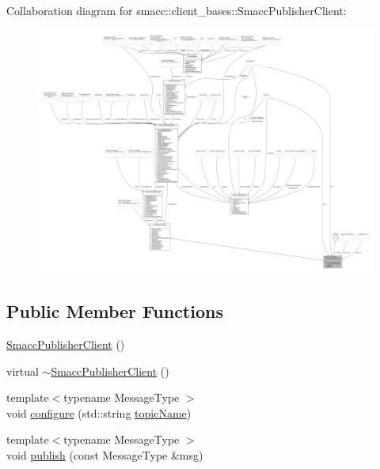 Collaboration diagram for smacc\+:\+:client\+\_\+bases\+:\+:Smacc\+Publisher\+Client\+:
\nopagebreak
\begin{figure}[H]
\begin{center}
\leavevmode
\includegraphics[width=350pt]{classsmacc_1_1client__bases_1_1SmaccPublisherClient__coll__graph}
\end{center}
\end{figure}
\subsection*{Public Member Functions}
\begin{DoxyCompactItemize}
\item 
\hyperlink{classsmacc_1_1client__bases_1_1SmaccPublisherClient_ac1713f185a2b81c6143a8fea042d53fa}{Smacc\+Publisher\+Client} ()
\item 
virtual \hyperlink{classsmacc_1_1client__bases_1_1SmaccPublisherClient_ad528f768a7b99560db514924f9cb789f}{$\sim$\+Smacc\+Publisher\+Client} ()
\item 
{\footnotesize template$<$typename Message\+Type $>$ }\\void \hyperlink{classsmacc_1_1client__bases_1_1SmaccPublisherClient_ade7a2549ada725b8342633137eb6ad53}{configure} (std\+::string \hyperlink{classsmacc_1_1client__bases_1_1SmaccPublisherClient_a8b8d98aef9b3b3a441005d2cb17b4fcc}{topic\+Name})
\item 
{\footnotesize template$<$typename Message\+Type $>$ }\\void \hyperlink{classsmacc_1_1client__bases_1_1SmaccPublisherClient_a083abb0f5c0f587f3381a58fe1fe3669}{publish} (const Message\+Type \&msg)
\end{DoxyCompactItemize}
